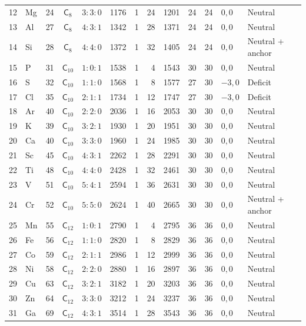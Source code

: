 {\begin{longtable}{@{}rllccrrrrrrll@{}}
12 & Mg & 24 & $\mathsf{C}_{8}$ & $3:3:0$ & 1176 & 1 & 24 & 1201 & 24 & 24 & $0,0$ & Neutral\\
13 & Al & 27 & $\mathsf{C}_{8}$ & $4:3:1$ & 1342 & 1 & 28 & 1371 & 24 & 24 & $0,0$ & Neutral\\
14 & Si & 28 & $\mathsf{C}_{8}$ & $4:4:0$ & 1372 & 1 & 32 & 1405 & 24 & 24 & $0,0$ & Neutral + anchor\\
15 & P & 31 & $\mathsf{C}_{10}$ & $1:0:1$ & 1538 & 1 & 4 & 1543 & 30 & 30 & $0,0$ & Neutral\\
16 & S & 32 & $\mathsf{C}_{10}$ & $1:1:0$ & 1568 & 1 & 8 & 1577 & 27 & 30 & $-3,0$ & Deficit\\
17 & Cl & 35 & $\mathsf{C}_{10}$ & $2:1:1$ & 1734 & 1 & 12 & 1747 & 27 & 30 & $-3,0$ & Deficit\\
18 & Ar & 40 & $\mathsf{C}_{10}$ & $2:2:0$ & 2036 & 1 & 16 & 2053 & 30 & 30 & $0,0$ & Neutral\\
19 & K & 39 & $\mathsf{C}_{10}$ & $3:2:1$ & 1930 & 1 & 20 & 1951 & 30 & 30 & $0,0$ & Neutral\\
20 & Ca & 40 & $\mathsf{C}_{10}$ & $3:3:0$ & 1960 & 1 & 24 & 1985 & 30 & 30 & $0,0$ & Neutral\\
21 & Sc & 45 & $\mathsf{C}_{10}$ & $4:3:1$ & 2262 & 1 & 28 & 2291 & 30 & 30 & $0,0$ & Neutral\\
22 & Ti & 48 & $\mathsf{C}_{10}$ & $4:4:0$ & 2428 & 1 & 32 & 2461 & 30 & 30 & $0,0$ & Neutral\\
23 & V & 51 & $\mathsf{C}_{10}$ & $5:4:1$ & 2594 & 1 & 36 & 2631 & 30 & 30 & $0,0$ & Neutral\\
24 & Cr & 52 & $\mathsf{C}_{10}$ & $5:5:0$ & 2624 & 1 & 40 & 2665 & 30 & 30 & $0,0$ & Neutral + anchor\\
25 & Mn & 55 & $\mathsf{C}_{12}$ & $1:0:1$ & 2790 & 1 & 4 & 2795 & 36 & 36 & $0,0$ & Neutral\\
26 & Fe & 56 & $\mathsf{C}_{12}$ & $1:1:0$ & 2820 & 1 & 8 & 2829 & 36 & 36 & $0,0$ & Neutral\\
27 & Co & 59 & $\mathsf{C}_{12}$ & $2:1:1$ & 2986 & 1 & 12 & 2999 & 36 & 36 & $0,0$ & Neutral\\
28 & Ni & 58 & $\mathsf{C}_{12}$ & $2:2:0$ & 2880 & 1 & 16 & 2897 & 36 & 36 & $0,0$ & Neutral\\
29 & Cu & 63 & $\mathsf{C}_{12}$ & $3:2:1$ & 3182 & 1 & 20 & 3203 & 36 & 36 & $0,0$ & Neutral\\
30 & Zn & 64 & $\mathsf{C}_{12}$ & $3:3:0$ & 3212 & 1 & 24 & 3237 & 36 & 36 & $0,0$ & Neutral\\
31 & Ga & 69 & $\mathsf{C}_{12}$ & $4:3:1$ & 3514 & 1 & 28 & 3543 & 36 & 36 & $0,0$ & Neutral\\

\end{longtable}}
